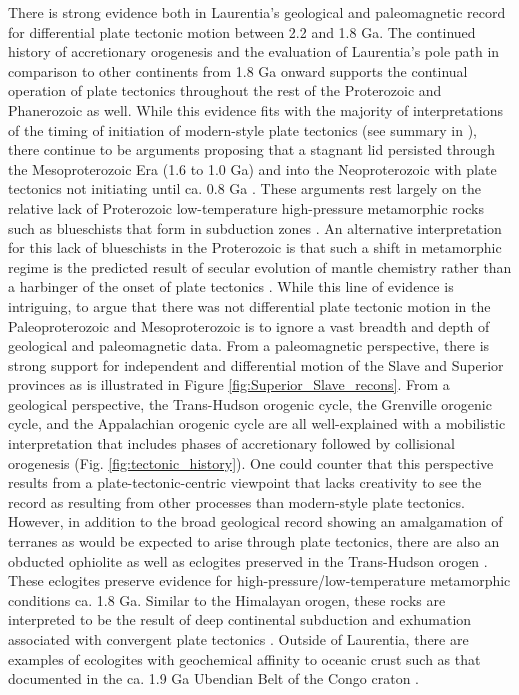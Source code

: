 \documentclass[11pt,letterpaper]{article}
\begin{document}
There is strong evidence both in Laurentia's geological and paleomagnetic record for differential plate tectonic motion between 2.2 and 1.8 Ga. The continued history of accretionary orogenesis and the evaluation of Laurentia's pole path in comparison to other continents from 1.8 Ga onward supports the continual operation of plate tectonics throughout the rest of the Proterozoic and Phanerozoic as well. While this evidence fits with the majority of interpretations of the timing of initiation of modern-style plate tectonics (see summary in \citealp{Korenaga2013a}), there continue to be arguments proposing that a stagnant lid persisted through the Mesoproterozoic Era (1.6 to 1.0 Ga) and into the Neoproterozoic  with plate tectonics not initiating until ca. 0.8 Ga \citep{Hamilton2011a, Stern2018a}. These arguments rest largely on the relative lack of Proterozoic low-temperature high-pressure metamorphic rocks such as blueschists that form in subduction zones \citep{Stern2013a}. An alternative interpretation for this lack of blueschists in the Proterozoic is that such a shift in metamorphic regime is the predicted result of secular evolution of mantle chemistry rather than a harbinger of the onset of plate tectonics \citep{Palin2015a}. While this line of evidence is intriguing, to argue that there was not differential plate tectonic motion in the Paleoproterozoic and Mesoproterozoic is to ignore a vast breadth and depth of geological and paleomagnetic data. From a paleomagnetic perspective, there is strong support for independent and differential motion of the Slave and Superior provinces as is illustrated in Figure \ref{fig:Superior_Slave_recons}. From a geological perspective, the Trans-Hudson orogenic cycle, the Grenville orogenic cycle, and the Appalachian orogenic cycle are all well-explained with a mobilistic interpretation that includes phases of accretionary followed by collisional orogenesis (Fig. \ref{fig:tectonic_history}). One could counter that this perspective results from a plate-tectonic-centric viewpoint that lacks creativity to see the record as resulting from other processes than modern-style plate tectonics. However, in addition to the broad geological record showing an amalgamation of terranes as would be expected to arise through plate tectonics, there are also an obducted ophiolite as well as eclogites preserved in the Trans-Hudson orogen \citep{Weller2017a}. These eclogites preserve evidence for high-pressure/low-temperature metamorphic conditions ca. 1.8 Ga. Similar to the Himalayan orogen, these rocks are interpreted to be the result of deep continental subduction and exhumation associated with convergent plate tectonics \citep{Weller2017a}. Outside of Laurentia, there are examples of ecologites with geochemical affinity to oceanic crust such as that documented in the ca. 1.9 Ga Ubendian Belt of the Congo craton \citep{Boniface2012a}.
\end{document}

